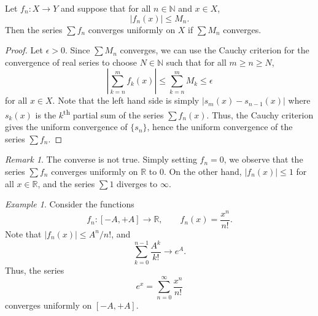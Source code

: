 \documentclass[11pt]{article}
\def\R{\mathbb{R}}
\def\N{\mathbb{N}}
\theoremstyle{definition}
\theoremstyle{remark}
\newtheorem*{remark}{Remark}
\newtheorem*{example}{Example}
\numberwithin{equation}{module}
\begin{document}
    \begin{theorem}
        Let $f_n\colon X \to Y$ and suppose that for all $n \in \N$ and $x \in X$,
        \[
            |f_n(x)| \leq M_n.
        \]
        Then the series $\sum f_n$ converges uniformly on $X$ if $\sum M_n$
        converges.
    \end{theorem}
    \begin{proof}
        Let $\epsilon > 0$. Since $\sum M_n$ converges, we can use the Cauchy
        criterion for the convergence of real series to choose $N \in \N$ such that
        for all $m \geq n \geq N$, \[
            \left|\sum_{k = n}^m f_k(x)\right| \leq \sum_{k = n}^m M_k \leq \epsilon
        \] for all $x \in X$.
        Note that the left hand side is simply $|s_m(x) - s_{n - 1}(x)|$ where
        $s_k(x)$ is the $k$\textsuperscript{th} partial sum of the series $\sum
        f_n(x)$. Thus, the Cauchy criterion gives the uniform convergence of 
        $\{s_n\}$, hence the uniform convergence of the series $\sum f_n$.
    \end{proof}
    \begin{remark}
        The converse is not true. Simply setting $f_n = 0$, we observe that the
        series $\sum f_n$ converges uniformly on $\R$ to $0$. On the other hand,
        $|f_n(x)| \leq 1$ for all $x \in \R$, and the series $\sum 1$ diverges to
        $\infty$.
    \end{remark}
    \begin{example}
        Consider the functions \[
            f_n\colon [-A, +A] \to \R, \qquad f_n(x) = \frac{x^n}{n!}.
        \] Note that $|f_n(x)| \leq A^n/ n!$, and \[
            \sum_{k = 0}^{n - 1} \frac{A^k}{k!} \to e^A.
        \] Thus, the series \[
            e^x = \sum_{n = 0}^\infty \frac{x^n}{n!}
        \] converges uniformly on $[-A, +A]$.
    \end{example}
\end{document}
